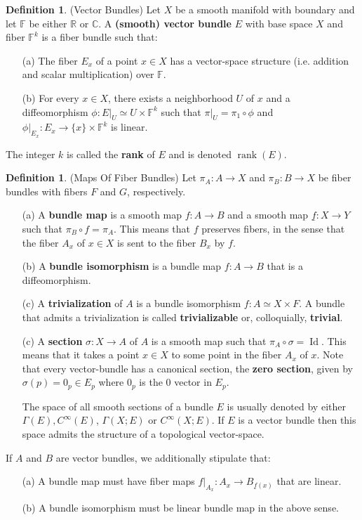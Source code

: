 \documentclass[12pt]{article}
\theoremstyle{definition}
\newtheorem{definition}[theorem]{Definition}
\numberwithin{equation}{section}
\newcommand{\C}{{\mathbb C}}
\newcommand{\R}{{\mathbb R}}
\newcommand{\op}{\operatorname}
\begin{document}
\begin{definition} \label{def:vector_bundles} (Vector Bundles) Let $X$ be a smooth manifold with boundary and let $\mathbb{F}$ be either $\R$ or $\C$. A {\bf (smooth) vector bundle} $E$ with base space $X$ and fiber $\mathbb{F}^k$ is a fiber bundle such that:
\begin{itemize}
	\item[(a)] The fiber $E_x$ of a point $x \in X$ has a vector-space structure (i.e. addition and scalar multiplication) over $\mathbb{F}$.
	\item[(b)] For every $x \in X$, there exists a neighborhood $U$ of $x$ and a diffeomorphism $\phi:E|_U \simeq U \times \mathbb{F}^k$ such that $\pi|_U = \pi_1 \circ \phi$ and $\phi|_{E_x}:E_x \to \{x\} \times \mathbb{F}^k$ is linear.
\end{itemize}
The integer $k$ is called the {\bf rank} of $E$ and is denoted $\op{rank}(E)$.
\end{definition}

\begin{definition} \label{def:maps_of_fiber_bundles} (Maps Of Fiber Bundles) Let $\pi_A:A \to X$ and $\pi_B:B \to X$ be fiber bundles with fibers $F$ and $G$, respectively.
\begin{enumerate}
	\item[(a)] A {\bf bundle map} is a smooth map $f:A \to B$ and a smooth map $\underline{f}:X \to Y$ such that $\pi_B \circ f = \pi_A$. This means that $f$ preserves fibers, in the sense that the fiber $A_x$ of $x \in X$ is sent to the fiber $B_{x}$ by $f$. 
	\item[(b)] A {\bf bundle isomorphism} is a bundle map $f:A \to B$ that is a diffeomorphism.
	\item[(c)] A {\bf trivialization} of $A$ is a bundle isomorphism $f:A \simeq X \times F$. A bundle that admits a trivialization is called {\bf trivializable} or, colloquially, {\bf trivial}.
	\item[(c)] A {\bf section} $\sigma:X \to A$ of $A$ is a smooth map such that $\pi_A \circ \sigma = \op{Id}$. This means that it takes a point $x \in X$ to some point in the fiber $A_x$ of $x$. Note that every vector-bundle has a canonical section, the {\bf zero section}, given by $\sigma(p) = 0_p \in E_p$ where $0_p$ is the $0$ vector in $E_p$.

	The space of all smooth sections of a bundle $E$ is usually denoted by either $\Gamma(E), C^\infty(E)$, $\Gamma(X;E)$ or $C^\infty(X;E)$. If $E$ is a vector bundle then this space admits the structure of a topological vector-space.
\end{enumerate}
If $A$ and $B$ are vector bundles, we additionally stipulate that:
\begin{enumerate}
	\item[(a)] A bundle map must have fiber maps $f|_{A_x}:A_x \to B_{\underline{f}(x)}$ that are linear.
	\item[(b)] A bundle isomorphism must be linear bundle map in the above sense. 
\end{enumerate}
\end{definition} 
\end{document}
